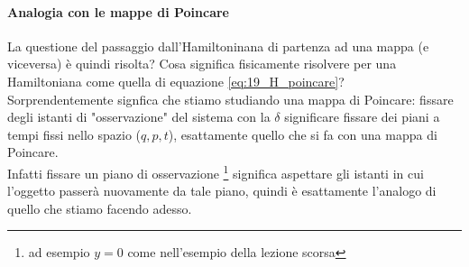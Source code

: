 \paragraph{Analogia con le mappe di Poincare}%
\label{par:Analogia con le mappe di Poincare}
La questione del passaggio dall'Hamiltoninana di partenza ad una mappa (e viceversa) è quindi risolta? Cosa significa fisicamente risolvere per una Hamiltoniana come quella di equazione \ref{eq:19_H_poincare}?\\
Sorprendentemente signfica che stiamo studiando una mappa di Poincare: fissare degli istanti di "osservazione" del sistema con la $\delta$ significare fissare dei piani a tempi fissi nello spazio ($q,p,t$), esattamente quello che si fa con una mappa di Poincare.\\
Infatti fissare un piano di osservazione
\footnote{ad esempio $y=0$ come nell'esempio della lezione scorsa}
significa aspettare gli istanti in cui l'oggetto passerà nuovamente da tale piano, quindi è esattamente l'analogo di quello che stiamo facendo adesso.

\clearpage
